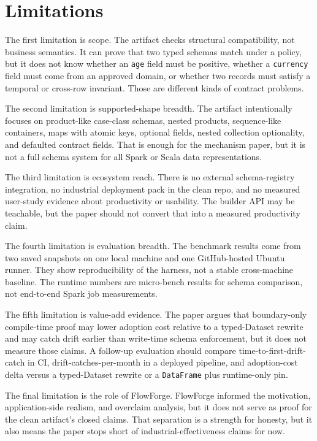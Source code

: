 \section{Limitations}

The first limitation is scope. The artifact checks structural compatibility, not business semantics. It can prove that two typed schemas match under a policy, but it does not know whether an \texttt{age} field must be positive, whether a \texttt{currency} field must come from an approved domain, or whether two records must satisfy a temporal or cross-row invariant. Those are different kinds of contract problems.

The second limitation is supported-shape breadth. The artifact intentionally focuses on product-like case-class schemas, nested products, sequence-like containers, maps with atomic keys, optional fields, nested collection optionality, and defaulted contract fields. That is enough for the mechanism paper, but it is not a full schema system for all Spark or Scala data representations.

The third limitation is ecosystem reach. There is no external schema-registry integration, no industrial deployment pack in the clean repo, and no measured user-study evidence about productivity or usability. The builder API may be teachable, but the paper should not convert that into a measured productivity claim.

The fourth limitation is evaluation breadth. The benchmark results come from two saved snapshots on one local machine and one GitHub-hosted Ubuntu runner. They show reproducibility of the harness, not a stable cross-machine baseline. The runtime numbers are micro-bench results for schema comparison, not end-to-end Spark job measurements.

The fifth limitation is value-add evidence. The paper argues that boundary-only compile-time proof may lower adoption cost relative to a typed-Dataset rewrite and may catch drift earlier than write-time schema enforcement, but it does not measure those claims. A follow-up evaluation should compare time-to-first-drift-catch in CI, drift-catches-per-month in a deployed pipeline, and adoption-cost delta versus a typed-Dataset rewrite or a \texttt{DataFrame} plus runtime-only pin.

The final limitation is the role of FlowForge. FlowForge informed the motivation, application-side realism, and overclaim analysis, but it does not serve as proof for the clean artifact's closed claims. That separation is a strength for honesty, but it also means the paper stops short of industrial-effectiveness claims for now.
